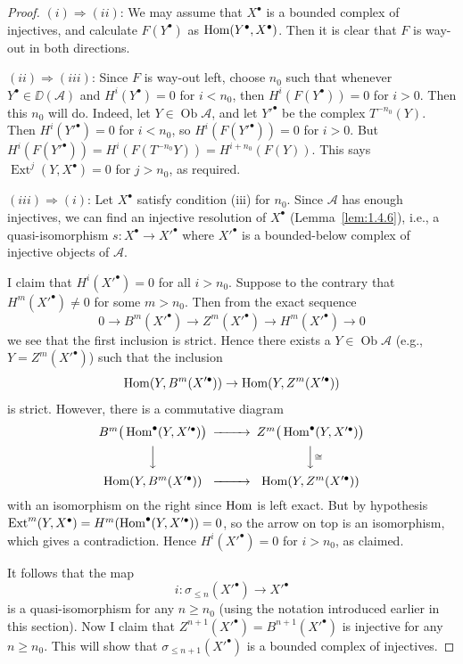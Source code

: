 \begin{proof}
$(i)\Rightarrow(ii)$: We may assume that $X^\bullet$ is a bounded
complex of injectives, and calculate $F(Y^\bullet)$ as $\operatorname{Hom}(Y^\bullet,X^\bullet)$. Then
it is clear that $F$ is way-out in both directions.


$(ii)\Rightarrow(iii)$: Since $F$ is way-out left, choose $n_0$ such that whenever
$Y^\bullet\in\DD(\mathcal{A})$ and $H^i(Y^\bullet)=0$ for $i<n_0$, then $H^i(F(Y^\bullet))=0$
for $i>0$. Then this $n_0$ will do. Indeed, let $Y\in\operatorname{Ob}\mathcal{A}$,
and let $Y'^\bullet$ be the complex $T^{-n_0}(Y)$. Then $H^i(Y'^\bullet)=0$ for
$i<n_0$, so $H^i(F(Y'^\bullet))=0$ for $i>0$. But
$H^i(F(Y'^\bullet)) = H^i(F(T^{-n_0}Y)) = H^{i+n_0}(F(Y))$.
This says $\operatorname{Ext}^j(Y,X^\bullet)=0$ for $j>n_0$, as required.

\medskip

$(iii)\Rightarrow(i)$: Let $X^\bullet$ satisfy condition (iii) for $n_0$. Since
$\mathcal{A}$ has enough injectives, we can find an injective resolution of
$X^\bullet$ (Lemma~\ref{lem:1.4.6}), i.e., a quasi-isomorphism
$s\colon X^\bullet\to X'^\bullet$ where $X'^\bullet$ is a bounded-below complex
of injective objects of $\mathcal{A}$.

I claim that $H^i(X'^\bullet)=0$ for all $i>n_0$. Suppose to the contrary
that $H^m(X'^\bullet)\neq 0$ for some $m>n_0$. Then from the exact sequence
\[
0 \to B^m(X'^\bullet) \to Z^m(X'^\bullet) \to H^m(X'^\bullet) \to 0
\]
we see that the first inclusion is strict. Hence there exists a
$Y\in\operatorname{Ob}\mathcal{A}$ (e.g., $Y=Z^m(X'^\bullet)$) such that the inclusion
\[
\operatorname{Hom}(Y, B^m(X'^\bullet)) \to \operatorname{Hom}(Y, Z^m(X'^\bullet))
\]
is strict. However, there is a commutative diagram
\[
\begin{CD}
B^m\big(\Hom^\bullet(Y,X'^\bullet)\big) @>>> Z^m\big(\Hom^\bullet(Y,X'^\bullet)\big) \\
@VVV @VV{\cong}V \\
\Hom(Y,B^m(X'^\bullet)) @>>> \Hom(Y,Z^m(X'^\bullet))
\end{CD}
\]
with an isomorphism on the right since $\operatorname{Hom}$ is left exact.
But by hypothesis $\operatorname{Ext}^m(Y,X^\bullet) = H^m(\operatorname{Hom}^\bullet(Y,X'^\bullet)) = 0$,
so the arrow on top is an isomorphism, which gives a contradiction.
Hence $H^i(X'^\bullet)=0$ for $i>n_0$, as claimed.

It follows that the map
\[
i\colon \sigma_{\le n}(X'^\bullet) \to X'^\bullet
\]
is a quasi-isomorphism for any $n\ge n_0$ (using the notation introduced
earlier in this section). Now I claim that
$Z^{n+1}(X'^\bullet)=B^{n+1}(X'^\bullet)$ is injective for any $n\ge n_0$.
This will show that $\sigma_{\le n+1}(X'^\bullet)$ is a bounded complex of
injectives.


\end{proof}
